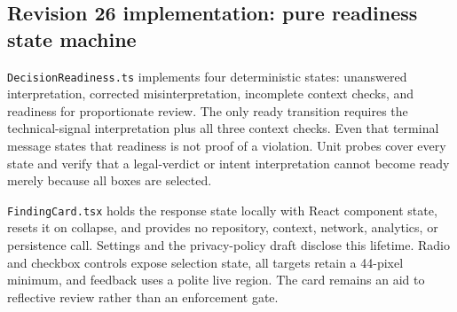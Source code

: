 

\subsection{Revision 26 implementation: pure readiness state machine}

\texttt{DecisionReadiness.ts} implements four deterministic states: unanswered interpretation, corrected misinterpretation, incomplete context checks, and readiness for proportionate review. The only ready transition requires the technical-signal interpretation plus all three context checks. Even that terminal message states that readiness is not proof of a violation. Unit probes cover every state and verify that a legal-verdict or intent interpretation cannot become ready merely because all boxes are selected.

\texttt{FindingCard.tsx} holds the response state locally with React component state, resets it on collapse, and provides no repository, context, network, analytics, or persistence call. Settings and the privacy-policy draft disclose this lifetime. Radio and checkbox controls expose selection state, all targets retain a 44-pixel minimum, and feedback uses a polite live region. The card remains an aid to reflective review rather than an enforcement gate.

